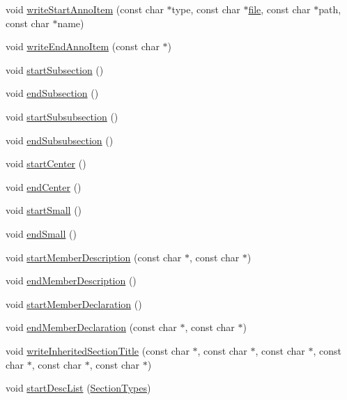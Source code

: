 \begin{DoxyCompactItemize}
void \hyperlink{class_man_generator_a8a403fb64475a8a08a959176fdd754f0}{write\+Start\+Anno\+Item} (const char $\ast$type, const char $\ast$\hyperlink{class_output_generator_aed5ad11c3844cdf71ec6fee6c1c84286}{file}, const char $\ast$path, const char $\ast$name)
\item 
void \hyperlink{class_man_generator_afda450fa7e610bf25690ca6211a3bf8e}{write\+End\+Anno\+Item} (const char $\ast$)
\item 
void \hyperlink{class_man_generator_a8b76bb902110b0df8f020b73207baf0c}{start\+Subsection} ()
\item 
void \hyperlink{class_man_generator_a4ae427e8787652bcc456f58f729079a3}{end\+Subsection} ()
\item 
void \hyperlink{class_man_generator_aedb1d92ae73f0d14dceac0f52eb159d1}{start\+Subsubsection} ()
\item 
void \hyperlink{class_man_generator_ab4ab218011dee86fa1e5f7938567aefb}{end\+Subsubsection} ()
\item 
void \hyperlink{class_man_generator_a0779e3309c5b48fef8be36d066e51879}{start\+Center} ()
\item 
void \hyperlink{class_man_generator_ac97abbbcd519a1c77f62516634feff3f}{end\+Center} ()
\item 
void \hyperlink{class_man_generator_a5a3d0de8665d88ae599c1d3d408356d3}{start\+Small} ()
\item 
void \hyperlink{class_man_generator_a1e934fe458d046107d45ab389ea645d8}{end\+Small} ()
\item 
void \hyperlink{class_man_generator_a8526e7060cc73cb4bac07aadf7bbbac9}{start\+Member\+Description} (const char $\ast$, const char $\ast$)
\item 
void \hyperlink{class_man_generator_a79c75e33f0931c60403f1f8c17f12808}{end\+Member\+Description} ()
\item 
void \hyperlink{class_man_generator_a19e8526336e7686234452bfe36420858}{start\+Member\+Declaration} ()
\item 
void \hyperlink{class_man_generator_a99c9249b28b3ec0a01bc379abca51448}{end\+Member\+Declaration} (const char $\ast$, const char $\ast$)
\item 
void \hyperlink{class_man_generator_a69751a9ead6f0704b5656143c137877d}{write\+Inherited\+Section\+Title} (const char $\ast$, const char $\ast$, const char $\ast$, const char $\ast$, const char $\ast$, const char $\ast$)
\item 
void \hyperlink{class_man_generator_a8aef21e6f671eda52e22a3941954fbc1}{start\+Desc\+List} (\hyperlink{class_base_output_doc_interface_a07a3d5df76a714674e070e5e236fe886}{Section\+Types})

\end{DoxyCompactItemize}
